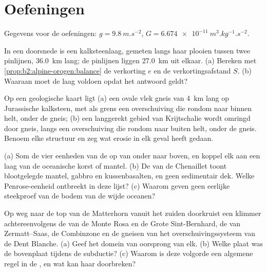 \section*{Oefeningen}\label{sec:b2:alpine-orogen:exercises}

Gegevens voor de oefeningen: $g = \qty{9.8}{m.s^{-2}}$,
$G = \qty{6.674e-11}{m^3.kg^{-1}.s^{-2}}$.

\begin{exercise}[$\star$]\label{exo:b2:alpine-orogen:1}
In een doorsnede is een kalksteenlaag, gemeten langs haar plooien tussen twee pinlijnen,
\qty{36.0}{km} lang; de pinlijnen liggen \qty{27.0}{km} uit elkaar. (a) Bereken met
\cref{prop:b2:alpine-orogen:balance} de verkorting $e$ en de verkortingsafstand
$S$. (b) Waaraan moet de laag voldoen opdat het antwoord geldt?
\end{exercise}

\begin{exercise}[$\star$]\label{exo:b2:alpine-orogen:2}
Op een geologische kaart ligt (a) een ovale vlek gneis van \qty{4}{km} lang op Jurassische
kalksteen, met als grens een overschuiving die rondom naar binnen helt, onder de gneis; (b) een
langgerekt gebied van Krijtschalie wordt omringd door gneis, langs een overschuiving die rondom naar buiten
helt, onder de gneis. Benoem elke structuur en zeg wat erosie in elk geval
heeft gedaan.
\end{exercise}

\begin{exercise}[$\star$]\label{exo:b2:alpine-orogen:3}
(a) Som de vier eenheden van de  op van onder naar boven, en koppel elk
aan een laag van de oceanische korst of mantel. (b) De  van de Chenaillet toont blootgelegde
mantel, gabbro en kussenbasalten, en geen sedimentair dek. Welke Penrose-eenheid ontbreekt in deze
lijst? (c) Waarom geven  geen eerlijke steekproef van de bodem van de wijde
oceanen?
\end{exercise}

\begin{exercise}[$\star$]\label{exo:b2:alpine-orogen:4}
Op weg naar de top van de Matterhorn vanuit het zuiden doorkruist een klimmer achtereenvolgens de  van de Monte Rosa en
de Grote Sint-Bernhard, de  van Zermatt--Saas, de Combinzone en de gneisen van
het overschuivingssysteem van de Dent Blanche. (a) Geef het domein van oorsprong van elk. (b) Welke plaat was
de bovenplaat tijdens de subductie? (c) Waarom is deze volgorde een algemene regel in de ,
en wat kan haar doorbreken?
\end{exercise}

